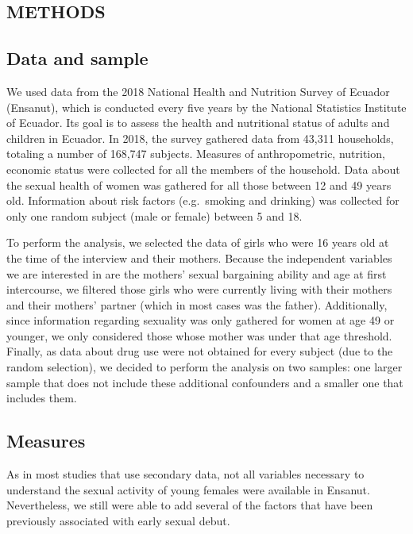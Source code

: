 \documentclass[
]{article}
\begin{document}
\hypertarget{methods}{%
\subsection{METHODS}\label{methods}}

\hypertarget{data-and-sample}{%
\subsection{Data and sample}\label{data-and-sample}}

We used data from the 2018 National Health and Nutrition Survey of
Ecuador (Ensanut), which is conducted every five years by the National
Statistics Institute of Ecuador. Its goal is to assess the health and
nutritional status of adults and children in Ecuador. In 2018, the
survey gathered data from 43,311 households, totaling a number of
168,747 subjects. Measures of anthropometric, nutrition, economic status
were collected for all the members of the household. Data about the
sexual health of women was gathered for all those between 12 and 49
years old. Information about risk factors (e.g.~smoking and drinking)
was collected for only one random subject (male or female) between 5 and
18.

To perform the analysis, we selected the data of girls who were 16 years
old at the time of the interview and their mothers. Because the
independent variables we are interested in are the mothers' sexual
bargaining ability and age at first intercourse, we filtered those girls
who were currently living with their mothers and their mothers' partner
(which in most cases was the father). Additionally, since information
regarding sexuality was only gathered for women at age 49 or younger, we
only considered those whose mother was under that age threshold.
Finally, as data about drug use were not obtained for every subject (due
to the random selection), we decided to perform the analysis on two
samples: one larger sample that does not include these additional
confounders and a smaller one that includes them.

\hypertarget{measures}{%
\subsection{Measures}\label{measures}}

As in most studies that use secondary data, not all variables necessary
to understand the sexual activity of young females were available in
Ensanut. Nevertheless, we still were able to add several of the factors
that have been previously associated with early sexual debut.
\end{document}
